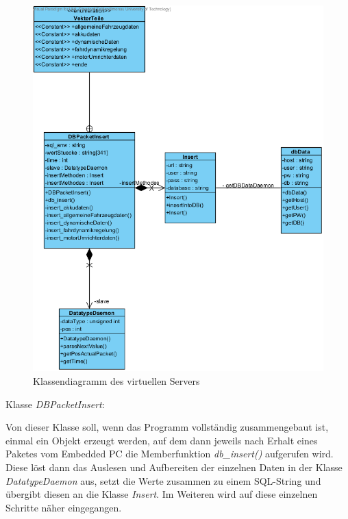 \documentclass[fontsize = 12pt, paper = a4]{scrreprt}
\begin{document}
\begin{figure}[h]
\centering
\includegraphics[scale = 0.9]{vServer}
\caption[Klassendiagramm des virtuellen Servers]{Klassendiagramm des virtuellen Servers}
\label{classvServer}
\end{figure} 

Klasse \textit{DBPacketInsert}:

Von dieser Klasse soll, wenn das Programm vollständig zusammengebaut ist, einmal ein Objekt erzeugt werden, auf dem dann jeweils nach Erhalt eines Paketes vom Embedded PC die Memberfunktion \textit{db\_insert()} aufgerufen wird. Diese löst dann das Auslesen und Aufbereiten der einzelnen Daten in der Klasse \textit{DatatypeDaemon} aus, setzt die Werte zusammen zu einem SQL-String und übergibt diesen an die Klasse \textit{Insert}. Im Weiteren wird auf diese einzelnen Schritte näher eingegangen.\\
\end{document}
